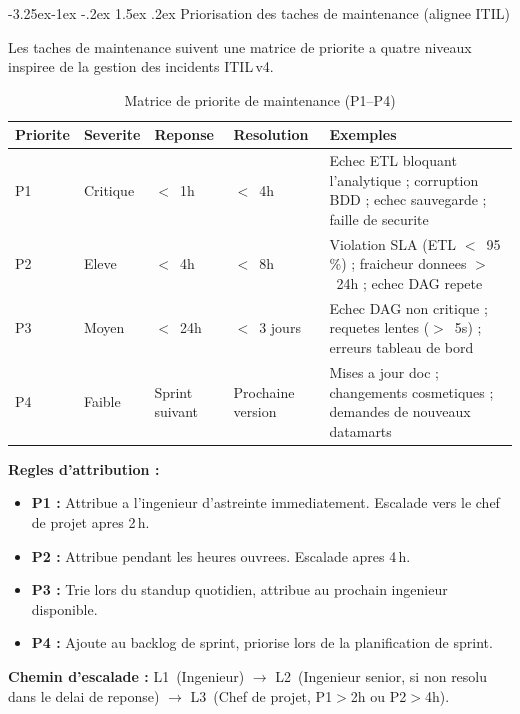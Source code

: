 \documentclass[a4paper,11pt,oneside,openany]{report}
\makeatletter
\renewcommand\subsection{\@startsection{subsection}{2}{\z@}%
  {-3.25ex\@plus -1ex \@minus -.2ex}%
  {1.5ex \@plus .2ex}%
  {\normalfont\large\bfseries\color{ntdarkgreen}}}
\makeatother
\begin{document}
\subsection{Priorisation des taches de maintenance (alignee ITIL)}

Les taches de maintenance suivent une matrice de priorite a quatre
niveaux inspiree de la gestion des incidents ITIL\,v4.

\begin{table}[H]
\centering
\caption{Matrice de priorite de maintenance (P1--P4)}
\label{tab:priority-matrix}
\begin{tabularx}{\textwidth}{C{1.2cm} C{1.5cm} C{1.8cm} C{2cm} L{5cm}}
\toprule
\textbf{Priorite} & \textbf{Severite} & \textbf{Reponse} & \textbf{Resolution} & \textbf{Exemples} \\
\midrule
P1 & Critique & $<$~1h & $<$~4h & Echec ETL bloquant l'analytique ; corruption BDD ; echec sauvegarde ; faille de securite \\
P2 & Eleve & $<$~4h & $<$~8h & Violation SLA (ETL $<$~95\,\%) ; fraicheur donnees $>$~24h ; echec DAG repete \\
P3 & Moyen & $<$~24h & $<$~3 jours & Echec DAG non critique ; requetes lentes ($>$~5s) ; erreurs tableau de bord \\
P4 & Faible & Sprint suivant & Prochaine version & Mises a jour doc ; changements cosmetiques ; demandes de nouveaux datamarts \\
\bottomrule
\end{tabularx}
\end{table}

\textbf{Regles d'attribution :}
\begin{itemize}[nosep]
  \item \textbf{P1 :} Attribue a l'ingenieur d'astreinte immediatement.
        Escalade vers le chef de projet apres 2\,h.
  \item \textbf{P2 :} Attribue pendant les heures ouvrees.
        Escalade apres 4\,h.
  \item \textbf{P3 :} Trie lors du standup quotidien, attribue au
        prochain ingenieur disponible.
  \item \textbf{P4 :} Ajoute au backlog de sprint, priorise lors de
        la planification de sprint.
\end{itemize}

\textbf{Chemin d'escalade :}
L1~(Ingenieur) $\to$ L2~(Ingenieur senior, si non resolu dans le delai
de reponse) $\to$ L3~(Chef de projet, P1$>$2h ou P2$>$4h).
\end{document}
